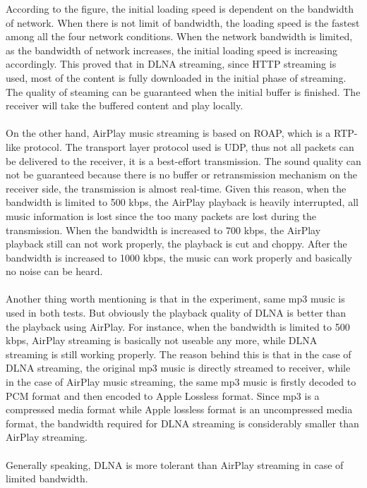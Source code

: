 According to the figure, the initial loading speed is dependent on the bandwidth of network. When there is not limit of bandwidth, the loading speed is the fastest among all the four network conditions. When the network bandwidth is limited, as the bandwidth of network increases, the initial loading speed is increasing accordingly. This proved that in DLNA streaming, since HTTP streaming is used, most of the content is fully downloaded in the initial phase of streaming. The quality of steaming can be guaranteed when the initial buffer is finished. The receiver will take the buffered content and play locally.\\
\\
On the other hand, AirPlay music streaming is based on ROAP, which is a RTP-like protocol. The transport layer protocol used is UDP, thus not all packets can be delivered to the receiver, it is a best-effort transmission. The sound quality can not be guaranteed because there is no buffer or retransmission mechanism on the receiver side, the transmission is almost real-time. Given this reason, when the bandwidth is limited to 500 kbps, the AirPlay playback is heavily interrupted, all music information is lost since the too many packets are lost during the transmission. When the bandwidth is increased to 700 kbps, the AirPlay playback still can not work properly, the playback is cut and choppy. After the bandwidth is increased to 1000 kbps, the music can work properly and basically no noise can be heard.\\
\\
Another thing worth mentioning is that in the experiment, same mp3 music is used in both tests. But obviously the playback quality of DLNA is better than the playback using AirPlay. For instance, when the bandwidth is limited to 500 kbps, AirPlay streaming is basically not useable any more, while DLNA streaming is still working properly. The reason behind this is that in the case of DLNA streaming, the original mp3 music is directly streamed to receiver, while in the case of AirPlay music streaming, the same mp3 music is firstly decoded to PCM format and then encoded to Apple Lossless format. Since mp3 is a compressed media format while Apple lossless format is an uncompressed media format, the bandwidth required for DLNA streaming is considerably smaller than AirPlay streaming.\\
\\
Generally speaking, DLNA is more tolerant than AirPlay streaming in case of limited bandwidth.\\
